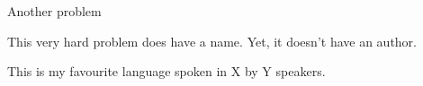 \documentclass[a4paper, 12pt, english]{article}
\begin{document}
\begin{problem}{Another problem}{}

This very hard problem does have a name. Yet, it doesn't have an author.

\begin{tasks}
\end{tasks}

\begin{langinfo*}
This is my favourite language spoken in X by Y speakers.
\end{langinfo*}

\end{problem}
\end{document}
